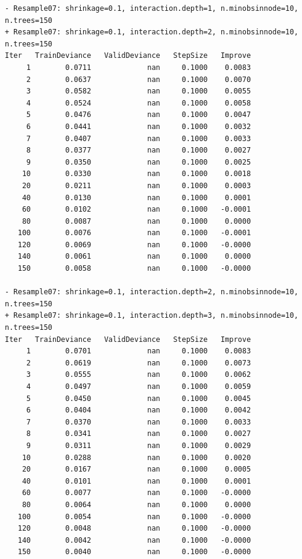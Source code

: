 \documentclass[
  letterpaper,
  DIV=11,
  numbers=noendperiod]{scrartcl}
\begin{document}
\begin{verbatim}
- Resample07: shrinkage=0.1, interaction.depth=1, n.minobsinnode=10, n.trees=150 
+ Resample07: shrinkage=0.1, interaction.depth=2, n.minobsinnode=10, n.trees=150 
Iter   TrainDeviance   ValidDeviance   StepSize   Improve
     1        0.0711             nan     0.1000    0.0083
     2        0.0637             nan     0.1000    0.0070
     3        0.0582             nan     0.1000    0.0055
     4        0.0524             nan     0.1000    0.0058
     5        0.0476             nan     0.1000    0.0047
     6        0.0441             nan     0.1000    0.0032
     7        0.0407             nan     0.1000    0.0033
     8        0.0377             nan     0.1000    0.0027
     9        0.0350             nan     0.1000    0.0025
    10        0.0330             nan     0.1000    0.0018
    20        0.0211             nan     0.1000    0.0003
    40        0.0130             nan     0.1000    0.0001
    60        0.0102             nan     0.1000   -0.0001
    80        0.0087             nan     0.1000    0.0000
   100        0.0076             nan     0.1000   -0.0001
   120        0.0069             nan     0.1000   -0.0000
   140        0.0061             nan     0.1000    0.0000
   150        0.0058             nan     0.1000   -0.0000

- Resample07: shrinkage=0.1, interaction.depth=2, n.minobsinnode=10, n.trees=150 
+ Resample07: shrinkage=0.1, interaction.depth=3, n.minobsinnode=10, n.trees=150 
Iter   TrainDeviance   ValidDeviance   StepSize   Improve
     1        0.0701             nan     0.1000    0.0083
     2        0.0619             nan     0.1000    0.0073
     3        0.0555             nan     0.1000    0.0062
     4        0.0497             nan     0.1000    0.0059
     5        0.0450             nan     0.1000    0.0045
     6        0.0404             nan     0.1000    0.0042
     7        0.0370             nan     0.1000    0.0033
     8        0.0341             nan     0.1000    0.0027
     9        0.0311             nan     0.1000    0.0029
    10        0.0288             nan     0.1000    0.0020
    20        0.0167             nan     0.1000    0.0005
    40        0.0101             nan     0.1000    0.0001
    60        0.0077             nan     0.1000   -0.0000
    80        0.0064             nan     0.1000    0.0000
   100        0.0054             nan     0.1000   -0.0000
   120        0.0048             nan     0.1000   -0.0000
   140        0.0042             nan     0.1000   -0.0000
   150        0.0040             nan     0.1000   -0.0000


\end{verbatim}
\end{document}

